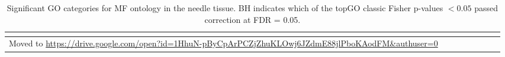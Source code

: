 \begin{longtable}{llllrlrr}
\caption{Significant GO categories for MF ontology in the needle tissue. BH indicates which of the topGO classic Fisher p-values $< 0.05$ passed correction at FDR = 0.05.}\\
\label{tab:go-needle-MF}\\
\toprule
    Moved to \scriptsize{\url{https://drive.google.com/open?id=1HhuN-pByCpArPCZjZhuKLOwj6JZdmE88jlPboKAodFM&authuser=0}} \\
    \bottomrule
\end{longtable}
